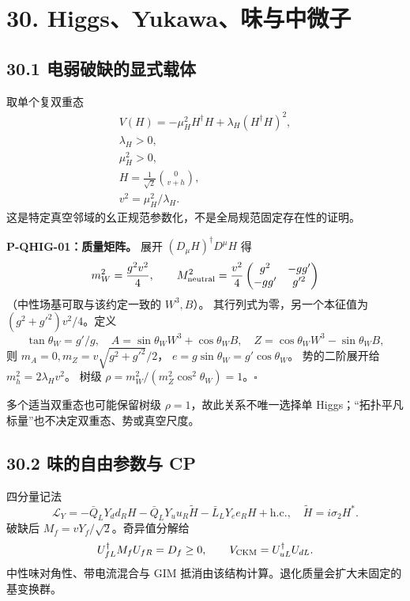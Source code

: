 \documentclass[
  11pt,
  oneside]{book}
\begin{document}
\hypertarget{ch-30}{%
\chapter{30. Higgs、Yukawa、味与中微子}\label{ch-30}}

\hypertarget{ux7535ux5f31ux7834ux7f3aux7684ux663eux5f0fux8f7dux4f53}{%
\section{30.1
电弱破缺的显式载体}\label{ux7535ux5f31ux7834ux7f3aux7684ux663eux5f0fux8f7dux4f53}}

取单个复双重态 \[
\begin{gathered}
V(H)=-\mu_H^2H^\dagger H+\lambda_H(H^\dagger H)^2,
\\ \lambda_H>0,\\ \mu_H^2>0,\\
H=\frac1{\sqrt2}\binom{0}{v+h},\\ v^2=\mu_H^2/\lambda_H.
\end{gathered}
\] 这是特定真空邻域的幺正规范参数化，不是全局规范固定存在性的证明。

\protect\hypertarget{p-qhig-01}{}{}

\textbf{P-QHIG-01：质量矩阵。} 展开 \((D_\mu H)^\dagger D^\mu H\) 得 \[
m_W^2=\frac{g^2v^2}{4},\qquad
M_{\rm neutral}^2=\frac{v^2}{4}
\begin{pmatrix}g^2&-gg'\\-gg'&g'^2\end{pmatrix}
\] （中性场基可取与该约定一致的 \(W^3,B\)）。
其行列式为零，另一个本征值为 \((g^2+g'^2)v^2/4\)。定义 \[
\tan\theta_W=g'/g,\quad
A=\sin\theta_W W^3+\cos\theta_W B,\quad
Z=\cos\theta_W W^3-\sin\theta_W B,
\] 则 \(m_A=0,m_Z=v\sqrt{g^2+g'^2}/2\)，
\(e=g\sin\theta_W=g'\cos\theta_W\)。 势的二阶展开给
\(m_h^2=2\lambda_Hv^2\)。 树级
\(\rho=m_W^2/(m_Z^2\cos^2\theta_W)=1\)。\(\square\)

多个适当双重态也可能保留树级 \(\rho=1\)，故此关系不唯一选择单
Higgs；``拓扑平凡标量''也不决定双重态、势或真空尺度。

\hypertarget{ux5473ux7684ux81eaux7531ux53c2ux6570ux4e0e-cp}{%
\section{30.2 味的自由参数与
CP}\label{ux5473ux7684ux81eaux7531ux53c2ux6570ux4e0e-cp}}

四分量记法 \[
\mathcal L_Y=-\bar Q_LY_dd_RH-\bar Q_LY_uu_R\widetilde H
-\bar L_LY_ee_RH+\mathrm{h.c.},\quad \widetilde H=i\sigma_2H^*.
\] 破缺后 \(M_f=vY_f/\sqrt2\)。奇异值分解给 \[
U_{fL}^\dagger M_fU_{fR}=D_f\ge0,\qquad
V_{\rm CKM}=U_{uL}^\dagger U_{dL}.
\] 中性味对角性、带电流混合与 GIM
抵消由该结构计算。退化质量会扩大未固定的基变换群。
\end{document}
